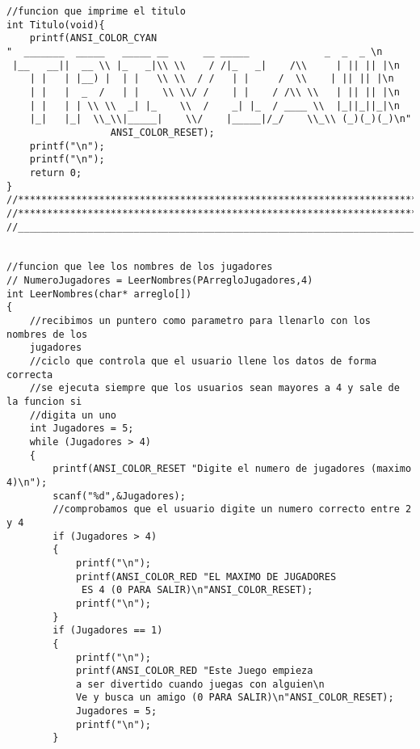 \begin{verbatim}
//funcion que imprime el titulo
int Titulo(void){
    printf(ANSI_COLOR_CYAN 
"  _______  _____   _____ __      __ _____             _  _  _ \n
 |__   __||  __ \\ |_   _|\\ \\    / /|_   _|    /\\     | || || |\n
    | |   | |__) |  | |   \\ \\  / /   | |     /  \\    | || || |\n
    | |   |  _  /   | |    \\ \\/ /    | |    / /\\ \\   | || || |\n
    | |   | | \\ \\  _| |_    \\  /    _| |_  / ____ \\  |_||_||_|\n
    |_|   |_|  \\_\\|_____|    \\/    |_____|/_/    \\_\\ (_)(_)(_)\n"
                  ANSI_COLOR_RESET);  
    printf("\n");
    printf("\n");
    return 0;
}
//*************************************************************************************
//*************************************************************************************
//_____________________________________________________________________________________


//funcion que lee los nombres de los jugadores
// NumeroJugadores = LeerNombres(PArregloJugadores,4)
int LeerNombres(char* arreglo[])
{
    //recibimos un puntero como parametro para llenarlo con los nombres de los 
    jugadores
    //ciclo que controla que el usuario llene los datos de forma correcta
    //se ejecuta siempre que los usuarios sean mayores a 4 y sale de la funcion si
    //digita un uno
    int Jugadores = 5;
    while (Jugadores > 4)
    {
        printf(ANSI_COLOR_RESET "Digite el numero de jugadores (maximo 4)\n");
        scanf("%d",&Jugadores);
        //comprobamos que el usuario digite un numero correcto entre 2 y 4
        if (Jugadores > 4)
        {
            printf("\n");
            printf(ANSI_COLOR_RED "EL MAXIMO DE JUGADORES
             ES 4 (0 PARA SALIR)\n"ANSI_COLOR_RESET);
            printf("\n");
        }
        if (Jugadores == 1)
        {
            printf("\n");
            printf(ANSI_COLOR_RED "Este Juego empieza 
            a ser divertido cuando juegas con alguien\n
            Ve y busca un amigo (0 PARA SALIR)\n"ANSI_COLOR_RESET);
            Jugadores = 5;
            printf("\n");
        }


\end{verbatim}
